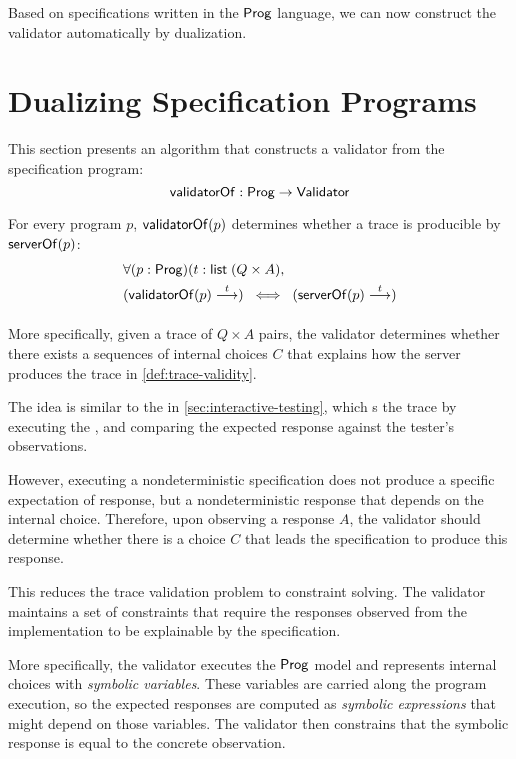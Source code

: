 Based on specifications written in the $\mathsf{Prog}$ language, we can now construct
the validator automatically by dualization.

\section{Dualizing Specification Programs}
\label{sec:dualize-prog}
This section presents an algorithm that constructs a validator from the
specification program:
\[\mathsf{validatorOf}:\mathsf{Prog}\to\mathsf{Validator}\]

For every program $p$, $\mathsf{validatorOf}(p)$ determines whether a trace is
producible by $\mathsf{serverOf}(p)$:
\begin{align*}
  &\forall (p:\Prog)(t:\List(Q\times A),\\
  &(\behaves{\validatorOf(p)}t)\;\iff\;(\behaves{\serverOf(p)}t)
\end{align*}

More specifically, given a trace of $Q\times A$ pairs, the validator determines
whether there exists a sequences of internal choices $C$ that explains how the
server produces the trace in \autoref{def:trace-validity}.

The idea is similar to the  in \autoref{sec:interactive-testing},
which s the trace by executing the , and comparing
the expected response against the tester's observations.

However, executing a nondeterministic specification does not produce a specific
expectation of response, but a nondeterministic response that depends on the
internal choice.  Therefore, upon observing a response $A$, the validator should
determine whether there is a choice $C$ that leads the specification to produce
this response.

This reduces the trace validation problem to constraint solving.  The validator
maintains a set of constraints that require the responses observed from the
implementation to be explainable by the specification.

More specifically, the validator executes the $\mathsf{Prog}$ model and represents
internal choices with {\em symbolic variables}.  These variables are carried
along the program execution, so the expected responses are computed as {\em
  symbolic expressions} that might depend on those variables.  The validator
then constrains that the symbolic response is equal to the concrete observation.


